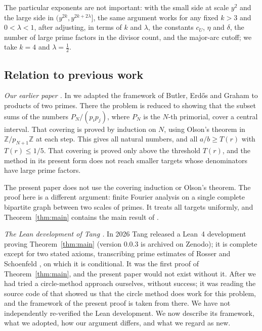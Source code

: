 \documentclass[11pt]{amsart}
\theoremstyle{definition}
\theoremstyle{remark}
\newcommand{\Z}{\mathbb{Z}}
\begin{document}
The particular exponents are not important: with the small side at scale $y^2$ and the large side in $(y^{2k},y^{2k+2\lambda}]$, the same argument works for any fixed $k>3$ and $0<\lambda<1$, after adjusting, in terms of $k$ and $\lambda$, the constants $c_U$, $\eta$ and $\delta$, the number of large prime factors in the divisor count, and the major-arc cutoff; we take $k=4$ and $\lambda=\frac12$.

\subsection*{Relation to previous work}\label{sec:intro-relation}

\emph{Our earlier paper \cite{Li26}.} In \cite{Li26} we adapted the framework of Butler, Erd\H{o}s and Graham \cite{BEG15} to products of two primes. There the problem is reduced to showing that the subset sums of the numbers $P_N/(p_ip_j)$, where $P_N$ is the $N$-th primorial, cover a central interval. That covering is proved by induction on $N$, using Olson's theorem \cite{Ols68} in $\Z/p_{N+1}\Z$ at each step. This gives all natural numbers, and all $a/b\ge T(r)$ with $T(r)\le1/5$. That covering is proved only above the threshold $T(r)$, and the method in its present form does not reach smaller targets whose denominators have large prime factors.

The present paper does not use the covering induction or Olson's theorem. The proof here is a different argument: finite Fourier analysis on a single complete bipartite graph between two scales of primes. It treats all targets uniformly, and Theorem~\ref{thm:main} contains the main result of \cite{Li26}.

\emph{The Lean development of Tang \cite{Tan26}.} In 2026 Tang released a Lean~4 development proving Theorem~\ref{thm:main} (version 0.0.3 is archived on Zenodo); it is complete except for two stated axioms, transcribing prime estimates of Rosser and Schoenfeld \cite{RS62}, on which it is conditional. It was the first proof of Theorem~\ref{thm:main}, and the present paper would not exist without it. After \cite{Li26} we had tried a circle-method approach ourselves, without success; it was reading the source code of \cite{Tan26} that showed us that the circle method does work for this problem, and the framework of the present proof is taken from there. We have not independently re-verified the Lean development. We now describe its framework, what we adopted, how our argument differs, and what we regard as new.
\end{document}
